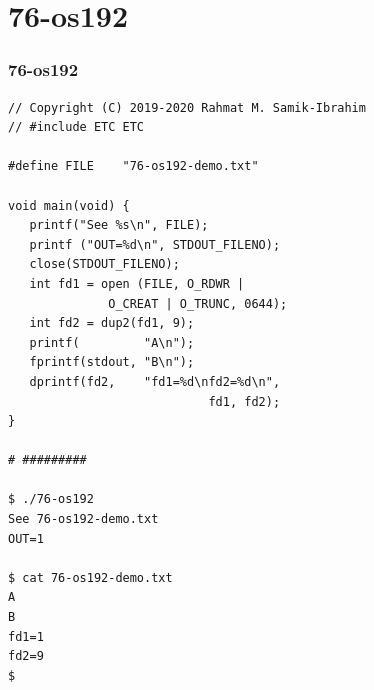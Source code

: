 \documentclass[aspectratio=169, xcolor=table, notheorems, hyperref={pdfpagelabels=false}]{beamer}
\begin{document}
\section{76-os192}
\begin{frame}[fragile]
\frametitle{76-os192}
\begin{lstlisting}[basicstyle=\ttfamily\tiny]
// Copyright (C) 2019-2020 Rahmat M. Samik-Ibrahim
// #include ETC ETC

#define FILE    "76-os192-demo.txt"

void main(void) {
   printf("See %s\n", FILE);
   printf ("OUT=%d\n", STDOUT_FILENO);
   close(STDOUT_FILENO);
   int fd1 = open (FILE, O_RDWR | 
              O_CREAT | O_TRUNC, 0644);
   int fd2 = dup2(fd1, 9);
   printf(         "A\n"); 
   fprintf(stdout, "B\n"); 
   dprintf(fd2,    "fd1=%d\nfd2=%d\n", 
                            fd1, fd2);
}

# #########

$ ./76-os192 
See 76-os192-demo.txt
OUT=1

$ cat 76-os192-demo.txt 
A
B
fd1=1
fd2=9
$ 

\end{lstlisting}
\end{frame}

\end{document}
